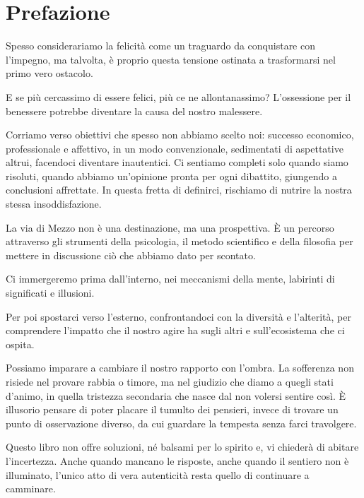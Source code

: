 \documentclass[12pt]{book} %
\date{2024-04-09}
\begin{document}


\thispagestyle{empty}
\tableofcontents %
\markboth{}{}    %
\thispagestyle{empty}

\clearpage\section{Prefazione}

Spesso considerariamo la felicità come un traguardo da conquistare con l'impegno, ma talvolta, è proprio questa tensione ostinata a trasformarsi nel primo vero ostacolo. 

E se più cercassimo di essere felici, più ce ne allontanassimo?
L'ossessione per il benessere potrebbe diventare la causa del nostro malessere.

Corriamo verso obiettivi che spesso non abbiamo scelto noi: successo economico, professionale e affettivo, in un modo convenzionale, sedimentati di aspettative altrui, facendoci diventare inautentici. Ci sentiamo completi solo quando siamo risoluti, quando abbiamo un’opinione pronta per ogni dibattito, giungendo a conclusioni affrettate. In questa fretta di definirci, rischiamo di nutrire la nostra stessa insoddisfazione.

La via di Mezzo non è una destinazione, ma una prospettiva. È un percorso attraverso gli strumenti della psicologia, il metodo scientifico e della filosofia per mettere in discussione ciò che abbiamo dato per scontato.

Ci immergeremo prima dall'interno, nei meccanismi della mente, labirinti di significati e illusioni.

Per poi spostarci verso l'esterno, confrontandoci con la diversità e l’alterità, per comprendere l'impatto che il nostro agire ha sugli altri e sull'ecosistema che ci ospita.

Possiamo imparare a cambiare il nostro rapporto con l'ombra. La sofferenza non risiede nel provare rabbia o timore, ma nel giudizio che diamo a quegli stati d’animo, in quella tristezza secondaria che nasce dal non volersi sentire così. È illusorio pensare di poter placare il tumulto dei pensieri, invece di trovare un punto di osservazione diverso, da cui guardare la tempesta senza farci travolgere.

Questo libro non offre soluzioni, né balsami per lo spirito e, vi chiederà di abitare l’incertezza. Anche quando mancano le risposte, anche quando il sentiero non è illuminato, l'unico atto di vera autenticità resta quello di continuare a camminare.
\end{document}
